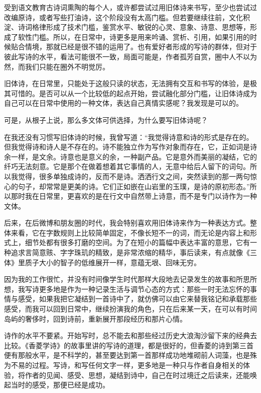 \documentclass{article}
\begin{document}
受到语文教育古诗词熏陶的每个人，或许都尝试过用旧体诗来书写，至少也尝试过改编原诗，或者写些打油诗，这个阶段没有太高门槛。但若要继续往前，文化积淀、诗词格律形成了技术门槛，鉴赏水平、敏锐的心灵、意象、诗意、思想等，形成了软性门槛。所以，在日常中，诗更多是用来吟诵、赏析、引用，如果引用的时候贴合情境，那就已经是很不错的运用了。也有爱好者形成的写诗的群体，但对于彼此写诗的水平，看法可能很不一致，局面可能是，作者孤芳自赏，圈中人不以为然，而我们只能在圈外不明觉厉。

旧体诗，在日常里，只能处于这般只读的状态，无法拥有交互和书写的体验，是极其可惜的。是否可以从一个比较低的起点开始，尝试融化部分门槛，让旧体诗成为自己可以在日常中使用的一种文体，表达自己真情实感呢？我发现是可以的。

可是，从根子上说，那么多文体可供选择，为什么要写旧体诗呢？

在我还没有习惯写旧体诗的时候，我曾写道：``我觉得诗意和诗的形式是存在的。但我觉得诗和诗人是不存在的。诗不能独立作为写作对象而存在，它，正如词是诗余一样，是文余。诗意也是意义的余，一种副产品。它是意外而美丽的凝结，它的纤巧无法刻意。它是那个在做着想着其它事情的人，无意中给后人留下的词句。所以我觉得，很多单独成诗的，反而不是诗。洒洒行文之间，突然读到的那一两句惊心的句子，却常常是更美的诗。它们正如嵌在山岩里的玉璞，是诗的原初形态。''所以那时我在日常里，更喜欢的是在行文中自然带上诗意，而不是专门以诗作为一种文体。

后来，在后微博和朋友圈的时代，我会特别喜欢用旧体诗来作为一种表达方式。整体来看，它在字数规则上比较简单固定，不像长短不一的词，而无论是内容上和形式上，细节处都有很多打磨的空间。为了在短小的篇幅中表达丰富的意思，它有一种追求言简意赅、字字珠玑的精致，是非常浓缩的精华，事后读来，有点就像《三体》里质子大小的智子的低维展开一样，意蕴无垠、回味无穷。

因为我的工作很忙，并没有时间像学生时代那样大段地去记录发生的故事和所思所想，我写诗更多地是作为一种记录生活与调节心态的方式：那些一时无法忘怀的事情与感受，如果我把它凝结到一首诗中了，就仿佛可以由它来替我铭记和承载那些感受，而我可以回到日常中，继续扮演我的角色，只在后来某一天，在可以有时间岛屿的奢侈时，回到诗前，重新展开那段经历和那片心情。

诗作的水平不要紧。开始写时，总不能去和那些经过历史大浪淘沙留下来的经典去比较。《香菱学诗》的故事里讲的写诗的道理，都是很好的，但香菱的诗到第三首便有那般水平，是不科学的，甚至要达到第一首那样成功地堆砌前人词藻，也是殊为不易的过程。写诗，和写任何文字一样，更多地是一种只与作者自身相关的体验，将作者的见闻、感受、思想，凝结到诗中，自己在时过境迁之后读来，还能唤起当时的感受，那便已经是成功。
\end{document}
